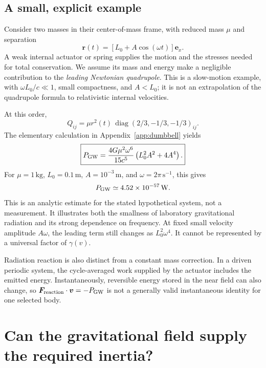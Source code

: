 \documentclass[11pt,a4paper]{article}
\numberwithin{equation}{section}
\begin{document}
\subsection{A small, explicit example}

Consider two masses in their center-of-mass frame, with reduced mass $\mu$ and separation
\begin{equation}
 \bm r(t)=[L_0+A\cos(\omega t)]\bm e_x.
 \label{eq:dumbbell}
\end{equation}
A weak internal actuator or spring supplies the motion and the stresses needed for total conservation. We assume its mass and energy make a negligible contribution to the \emph{leading Newtonian quadrupole}. This is a slow-motion example, with $\omega L_0/c\ll1$, small compactness, and $A<L_0$; it is not an extrapolation of the quadrupole formula to relativistic internal velocities.

At this order,
\begin{equation}
 Q_{ij}=\mu r^2(t)\,
 \operatorname{diag}(2/3,-1/3,-1/3)_{ij}.
\end{equation}
The elementary calculation in Appendix~\ref{app:dumbbell} yields
\begin{equation}
 \boxed{P_{\rm GW}=\frac{4G\mu^2\omega^6}{15c^5}
 \left(L_0^2A^2+4A^4\right).}
 \label{eq:dumbbell-power}
\end{equation}
For $\mu=1\,\mathrm{kg}$, $L_0=0.1\,\mathrm m$, $A=10^{-3}\,\mathrm m$, and $\omega=2\pi\,\mathrm{s}^{-1}$, this gives
\begin{equation}
 P_{\rm GW}\simeq4.52\times10^{-57}\,\mathrm W.
\end{equation}
This is an analytic estimate for the stated hypothetical system, not a measurement. It illustrates both the smallness of laboratory gravitational radiation and its strong dependence on frequency. At fixed small velocity amplitude $A\omega$, the leading term still changes as $L_0^2\omega^4$. It cannot be represented by a universal factor of $\gamma(v)$.

Radiation reaction is also distinct from a constant mass correction. In a driven periodic system, the cycle-averaged work supplied by the actuator includes the emitted energy. Instantaneously, reversible energy stored in the near field can also change, so $\bm F_{\rm reaction}\cdot\bm v=-P_{\rm GW}$ is not a generally valid instantaneous identity for one selected body.

\section{Can the gravitational field supply the required inertia?}
\label{sec:self-energy}
\end{document}
